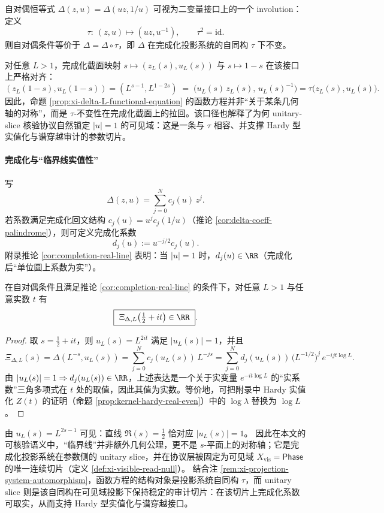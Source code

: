 \begin{remark}\label{rem:xi-projection-system-automorphism}
自对偶恒等式 \(\Delta(z,u)=\Delta(uz,1/u)\) 可视为二变量接口上的一个 involution：
定义
\[
\tau:\ (z,u)\longmapsto (uz,u^{-1}),
\qquad \tau^2=\mathrm{id}.
\]
则自对偶条件等价于 \(\Delta=\Delta\circ\tau\)，即 \(\Delta\) 在完成化投影系统的自同构 \(\tau\) 下不变。
\par
对任意 \(L>1\)，完成化截面映射 \(s\mapsto (z_L(s),u_L(s))\) 与 \(s\mapsto 1-s\) 在该接口上严格对齐：
\[
(z_L(1-s),u_L(1-s))
=(L^{s-1},L^{1-2s})
\;=\;
\bigl(u_L(s)\,z_L(s),\,u_L(s)^{-1}\bigr)
=\tau\bigl(z_L(s),u_L(s)\bigr).
\]
因此，命题 \ref{prop:xi-delta-L-functional-equation} 的函数方程并非“关于某条几何轴的对称”，而是 \(\tau\)-不变性在完成化截面上的拉回。该口径也解释了为何 unitary-slice 核验协议自然锁定 \(|u|=1\) 的可见域：这是一条与 \(\tau\) 相容、并支撑 Hardy 型实值化与谱穿越审计的参数切片。
\end{remark}

\paragraph{完成化与“临界线实值性”}
写
\[
\Delta(z,u)=\sum_{j=0}^{N}c_j(u)\,z^j.
\]
若系数满足完成化回文结构 \(c_j(u)=u^j c_j(1/u)\)（推论 \ref{cor:delta-coeff-palindrome}），则可定义完成化系数
\[
d_j(u):=u^{-j/2}c_j(u).
\]
附录推论 \ref{cor:completion-real-line} 表明：当 \(|u|=1\) 时，\(d_j(u)\in\RR\)（完成化后“单位圆上系数为实”）。

\begin{proposition}\label{prop:xi-delta-L-critical-line-real}
在自对偶条件且满足推论 \ref{cor:completion-real-line} 的条件下，对任意 \(L>1\) 与任意实数 \(t\) 有
\[
\boxed{\ \Xi_{\Delta,L}\!\left(\tfrac12+it\right)\in\RR\ }.
\]
\end{proposition}
\begin{proof}
取 \(s=\tfrac12+it\)，则 \(u_L(s)=L^{2it}\) 满足 \(|u_L(s)|=1\)，并且
\[
\Xi_{\Delta,L}(s)
=\Delta(L^{-s},u_L(s))
=\sum_{j=0}^{N}c_j(u_L(s))\,L^{-js}
=\sum_{j=0}^{N}d_j(u_L(s))\,\bigl(L^{-1/2}\bigr)^{j}\,e^{-ijt\log L}.
\]
由 \(|u_L(s)|=1\Rightarrow d_j(u_L(s))\in\RR\)，上述表达是一个关于实变量 \(e^{-it\log L}\) 的“实系数”三角多项式在 \(t\) 处的取值，因此其值为实数。等价地，可把附录中 Hardy 实值化 \(Z(t)\) 的证明（命题 \ref{prop:kernel-hardy-real-even}）中的 \(\log\lambda\) 替换为 \(\log L\)。
\end{proof}

\begin{remark}\label{rem:xi-critical-line-unit-circle}
由 \(u_L(s)=L^{2s-1}\) 可见：直线 \(\Re(s)=\tfrac12\) 恰对应 \(|u_L(s)|=1\)。
因此在本文的可核验语义中，“临界线”并非额外几何公理，更不是 \(s\)-平面上的对称轴；它是完成化投影系统在参数侧的 unitary slice，并在协议层被固定为可见域 \(X_{\mathrm{vis}}=\mathsf{Phase}\) 的唯一连续切片（定义 \ref{def:xi-visible-read-null}）。
结合注 \ref{rem:xi-projection-system-automorphism}，函数方程的结构对象是投影系统自同构 \(\tau\)，而 unitary slice 则是该自同构在可见域投影下保持稳定的审计切片：在该切片上完成化系数可取实，从而支持 Hardy 型实值化与谱穿越接口。
\end{remark}

